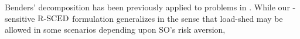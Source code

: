 Benders' decomposition has been previously applied to \SCED{} problems in \cite{liu2015computational,shi2022scenario}. While our \CVaR-sensitive $\text{R-SCED}$ formulation generalizes \CSCED{} in the sense that load-shed may be allowed in some scenarios depending upon SO's risk aversion, 



